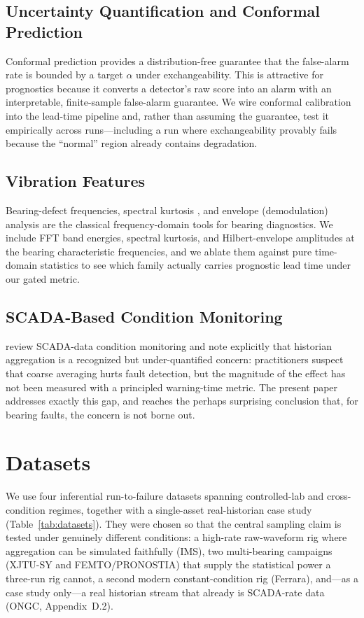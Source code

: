 \documentclass[IJPHM, 2026, 0]{PHMSociety}
\begin{document}
\subsection{Uncertainty Quantification and Conformal Prediction}
Conformal prediction \cite{vovk2005algorithmic,laxhammar2014online} provides a distribution-free guarantee that the false-alarm rate is bounded by a target $\alpha$ under exchangeability. This is attractive for prognostics because it converts a detector's raw score into an alarm with an interpretable, finite-sample false-alarm guarantee. We wire conformal calibration into the lead-time pipeline and, rather than assuming the guarantee, test it empirically across runs---including a run where exchangeability provably fails because the ``normal'' region already contains degradation.

\subsection{Vibration Features}
Bearing-defect frequencies, spectral kurtosis \cite{antoni2006spectral}, and envelope (demodulation) analysis \cite{randall2011rolling} are the classical frequency-domain tools for bearing diagnostics. We include FFT band energies, spectral kurtosis, and Hilbert-envelope amplitudes at the bearing characteristic frequencies, and we ablate them against pure time-domain statistics to see which family actually carries prognostic lead time under our gated metric.

\subsection{SCADA-Based Condition Monitoring}
 review SCADA-data condition monitoring and note explicitly that historian aggregation is a recognized but under-quantified concern: practitioners suspect that coarse averaging hurts fault detection, but the magnitude of the effect has not been measured with a principled warning-time metric. The present paper addresses exactly this gap, and reaches the perhaps surprising conclusion that, for bearing faults, the concern is not borne out.


\section{Datasets}
\label{sec:datasets}
We use four inferential run-to-failure datasets spanning controlled-lab and cross-condition regimes, together with a single-asset real-historian case study (Table~\ref{tab:datasets}). They were chosen so that the central sampling claim is tested under genuinely different conditions: a high-rate raw-waveform rig where aggregation can be simulated faithfully (IMS), two multi-bearing campaigns (XJTU-SY and FEMTO/PRONOSTIA) that supply the statistical power a three-run rig cannot, a second modern constant-condition rig (Ferrara), and---as a case study only---a real historian stream that already is SCADA-rate data (ONGC, Appendix~D.2).
\end{document}
